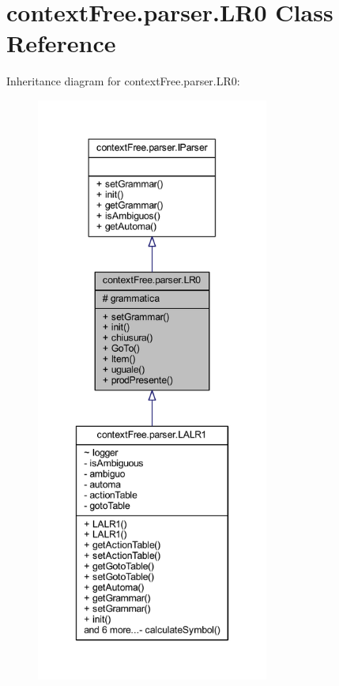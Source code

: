 \hypertarget{classcontext_free_1_1parser_1_1_l_r0}{\section{context\-Free.\-parser.\-L\-R0 Class Reference}
\label{classcontext_free_1_1parser_1_1_l_r0}
}


Inheritance diagram for context\-Free.\-parser.\-L\-R0\-:
\nopagebreak
\begin{figure}[H]
\begin{center}
\leavevmode
\includegraphics[height=550pt]{classcontext_free_1_1parser_1_1_l_r0__inherit__graph}
\end{center}
\end{figure}


